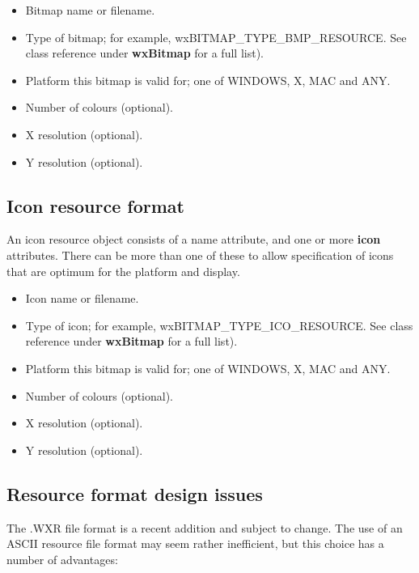 \begin{itemize}\itemsep=0pt
\item Bitmap name or filename.
\item Type of bitmap; for example, wxBITMAP\_TYPE\_BMP\_RESOURCE. See class reference under {\bf wxBitmap} for
a full list).
\item Platform this bitmap is valid for; one of WINDOWS, X, MAC and ANY.
\item Number of colours (optional).
\item X resolution (optional).
\item Y resolution (optional).
\end{itemize}

\subsection{Icon resource format}

An icon resource object consists of a name attribute, and one or more {\bf icon} attributes.
There can be more than one of these to allow specification of icons that are optimum for the
platform and display.

\begin{itemize}\itemsep=0pt
\item Icon name or filename.
\item Type of icon; for example, wxBITMAP\_TYPE\_ICO\_RESOURCE. See class reference under {\bf wxBitmap} for
a full list).
\item Platform this bitmap is valid for; one of WINDOWS, X, MAC and ANY.
\item Number of colours (optional).
\item X resolution (optional).
\item Y resolution (optional).
\end{itemize}


\subsection{Resource format design issues}

The .WXR file format is a recent addition and subject to change.
The use of an ASCII resource file format may seem rather inefficient, but this
choice has a number of advantages:

